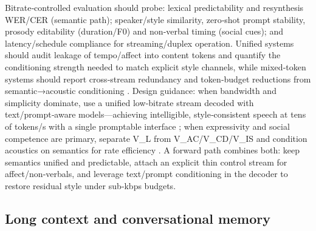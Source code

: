 \documentclass{article}
\begin{document}
Bitrate‑controlled evaluation should probe: lexical predictability and resynthesis WER/CER (semantic path); speaker/style similarity, zero‑shot prompt stability, prosody editability (duration/F0) and non‑verbal timing (social cues); and latency/schedule compliance for streaming/duplex operation. Unified systems should audit leakage of tempo/affect into content tokens and quantify the conditioning strength needed to match explicit style channels, while mixed‑token systems should report cross‑stream redundancy and token‑budget reductions from semantic→acoustic conditioning \cite{yang2025diffsoundstreamefficientspeechtokenizati}. Design guidance: when bandwidth and simplicity dominate, use a unified low‑bitrate stream decoded with text/prompt‑aware models—achieving intelligible, style‑consistent speech at tens of tokens/s with a single promptable interface \cite{zhang2024speechtokenizerunifiedspeechtokenizerlar,wang2025dualspeechlmtowardsunifiedspeechundersta,yang2025diffsoundstreamefficientspeechtokenizati,zhao2024textlessstreamingspeechtranslationsemant,jiang2025universalspeechtokenlearninglowbitratene}; when expressivity and social competence are primary, separate V_L from V_AC/V_CD/V_IS and condition acoustics on semantics for rate efficiency \cite{yang2025diffsoundstreamefficientspeechtokenizati,wang2025bossbeyondsemanticspeech}. A forward path combines both: keep semantics unified and predictable, attach an explicit thin control stream for affect/non‑verbals, and leverage text/prompt conditioning in the decoder to restore residual style under sub‑kbps budgets.

\subsection{Long context and conversational memory} \label{subsec:Long context and conversational memory}
\end{document}
